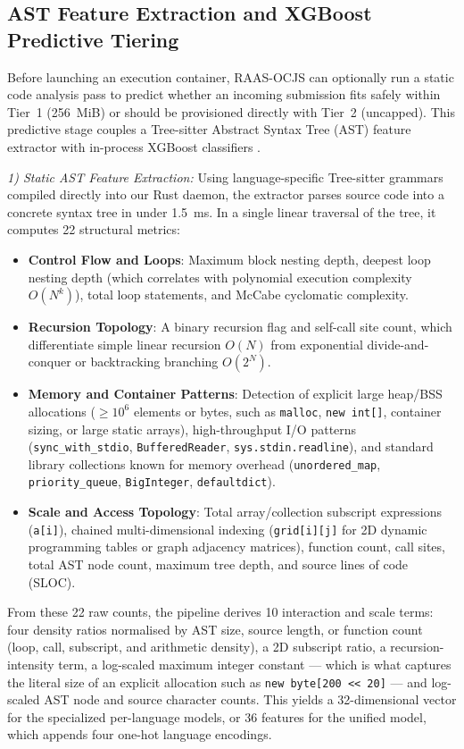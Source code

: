 \documentclass[conference]{IEEEtran}
\begin{document}
\subsection{AST Feature Extraction and XGBoost Predictive Tiering}
Before launching an execution container, RAAS-OCJS can optionally run a static code analysis pass to predict whether an incoming submission fits safely within Tier~1 (256~MiB) or should be provisioned directly with Tier~2 (uncapped). This predictive stage couples a Tree-sitter Abstract Syntax Tree (AST) feature extractor with in-process XGBoost classifiers \cite{chen2016xgboost}.

\textit{1) Static AST Feature Extraction:} Using language-specific Tree-sitter grammars compiled directly into our Rust daemon, the extractor parses source code into a concrete syntax tree in under 1.5~ms. In a single linear traversal of the tree, it computes 22 structural metrics:
\begin{itemize}
    \item \textbf{Control Flow and Loops}: Maximum block nesting depth, deepest loop nesting depth (which correlates with polynomial execution complexity $O(N^k)$), total loop statements, and McCabe cyclomatic complexity.
    \item \textbf{Recursion Topology}: A binary recursion flag and self-call site count, which differentiate simple linear recursion $O(N)$ from exponential divide-and-conquer or backtracking branching $O(2^N)$.
    \item \textbf{Memory and Container Patterns}: Detection of explicit large heap/BSS allocations ($\ge 10^6$ elements or bytes, such as \texttt{malloc}, \texttt{new int[]}, container sizing, or large static arrays), high-throughput I/O patterns (\texttt{sync\_with\_stdio}, \texttt{BufferedReader}, \texttt{sys.stdin.readline}), and standard library collections known for memory overhead (\texttt{unordered\_map}, \texttt{priority\_queue}, \texttt{BigInteger}, \texttt{defaultdict}).
    \item \textbf{Scale and Access Topology}: Total array/collection subscript expressions (\texttt{a[i]}), chained multi-dimensional indexing (\texttt{grid[i][j]} for 2D dynamic programming tables or graph adjacency matrices), function count, call sites, total AST node count, maximum tree depth, and source lines of code (SLOC).
\end{itemize}
From these 22 raw counts, the pipeline derives 10 interaction and scale terms: four density ratios normalised by AST size, source length, or function count (loop, call, subscript, and arithmetic density), a 2D subscript ratio, a recursion-intensity term, a log-scaled maximum integer constant --- which is what captures the literal size of an explicit allocation such as \texttt{new byte[200 << 20]} --- and log-scaled AST node and source character counts. This yields a 32-dimensional vector for the specialized per-language models, or 36 features for the unified model, which appends four one-hot language encodings.
\end{document}
